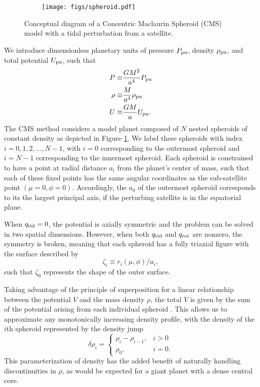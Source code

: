 \begin{figure}[h!]  
  \centering
    \texttt{[image: figs/spheroid.pdf]}
\caption{ Conceptual diagram of a Concentric Maclaurin Spheroid (CMS) model with a tidal
perturbation from a satellite.}
\label{fig:spheroid}
\end{figure}

We introduce dimensionless planetary units of pressure $P_{\rm pu}$, density
$\rho_{\rm pu}$, and total potential $U_{\rm pu}$, such that
%
\begin{equation} \begin{aligned} P \equiv& \frac{GM^2}{a^4} P_{\rm pu} \\ \rho
        \equiv& \frac{M}{a^3} \rho_{\rm pu} \\ U \equiv& \frac{GM}{a} U_{\rm pu}. \\
    \end{aligned} \label{eq:planetary_units} \end{equation}
%
The CMS method considers a model planet composed of $N$ nested spheroids of constant
density as depicted in Figure \ref{fig:spheroid}. We label these spheroids with index
$i=0,1,2,\dots,N-1$, with $i = 0$ corresponding to the outermost spheroid and $i=N-1$
corresponding to the innermost spheroid. Each spheroid is constrained to have a point
at radial distance $a_i$ from the planet's center of mass, such that each of these
fixed points has the same angular coordinates as the sub-satellite point
$(\mu=0,\phi=0)$.  Accordingly, the $a_0$ of the outermost spheroid corresponds to
its the largest principal axis, if the perturbing satellite is in the equatorial
plane.

When $q_{\rm tid}=0$, the potential is axially symmetric and the problem can be
solved in two spatial dimensions. However, when both $q_{\rm tid}$ and $q_{\rm rot}$
are nonzero, the symmetry is broken, meaning that each spheroid has a fully triaxial
figure with the surface described by
%
\begin{equation} \zeta_i \equiv r_i(\mu,\phi) / a_i, \label{eq:shape} \end{equation}
%
such that $\zeta_0$ represents the shape of the outer surface.

Taking advantage of the principle of superposition for a linear relationship between
the potential $V$ and the mass density $\rho$, the total $V$ is given by the sum of
the potential arising from each individual spheroid \citep{hubbard2013}. This allows us to
approximate any monotonically increasing density profile, with the density of the
$i$th spheroid represented by the density jump
%
\begin{equation} \delta \rho_i = \begin{cases} \rho_i - \rho_{i-1}, & i>0 \\ \rho_0,
        & i=0.  \end{cases} \label{eq:density_increment} \end{equation}
%
This parameterization of density has the added benefit of naturally handling
discontinuities in $\rho$, as would be expected for a giant planet with a dense
central core.


